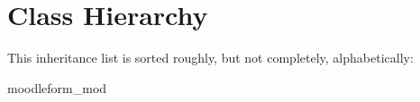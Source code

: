 \section{Class Hierarchy}
This inheritance list is sorted roughly, but not completely, alphabetically\-:\begin{DoxyCompactList}
\item moodleform\-\_\-mod\begin{DoxyCompactList}
\item {}
\end{DoxyCompactList}
\end{DoxyCompactList}
